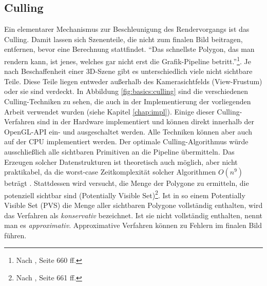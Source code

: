 \subsection{Culling}
\label{sec:basics:algos:culling}
Ein elementarer Mechanismus zur Beschleunigung des Rendervorgangs ist das Culling. Damit lassen sich Szenenteile, die nicht zum finalen Bild beitragen, entfernen, bevor eine Berechnung stattfindet. "`Das schnellste Polygon, das man rendern kann, ist jenes, welches gar nicht erst die Grafik-Pipeline betritt."'\footnote{Nach \cite{RTR3}, Seite 660 ff.}. Je nach Beschaffenheit einer 3D-Szene gibt es unterschiedlich viele nicht sichtbare Teile. Diese Teile liegen entweder außerhalb des Kamerasichtfelds (View-Frustum) oder sie sind verdeckt. In Abbildung \ref{fig:basics:culling} sind die verschiedenen Culling-Techniken zu sehen, die auch in der Implementierung der vorliegenden Arbeit verwendet wurden (siehe Kapitel \ref{chap:impl}).
Einige dieser Culling-Verfahren sind in der Hardware implementiert und können direkt innerhalb der OpenGL-API ein- und ausgeschaltet werden. Alle Techniken können aber auch auf der CPU implementiert werden. Der optimale Culling-Algorithmus würde ausschließlich alle sichtbaren Primitiven an die Pipeline übermitteln. Das Erzeugen solcher Datenstrukturen ist theoretisch auch möglich, aber nicht praktikabel, da die worst-case Zeitkomplexität solcher Algorithmen $O(n^{9})$ beträgt \cite{culling}. Stattdessen wird versucht, die Menge der Polygone zu ermitteln, die potenziell sichtbar sind (Potentially Visible Set)\footnote{Nach \cite{RTR3}, Seite 661 ff.}. Ist in so einem Potentially Visible Set (PVS) die Menge aller sichtbaren Polygone vollständig enthalten, wird das Verfahren als \textit{konservativ} bezeichnet. Ist sie nicht vollständig enthalten, nennt man es \textit{approximativ}. Approximative Verfahren können zu Fehlern im finalen Bild führen.

